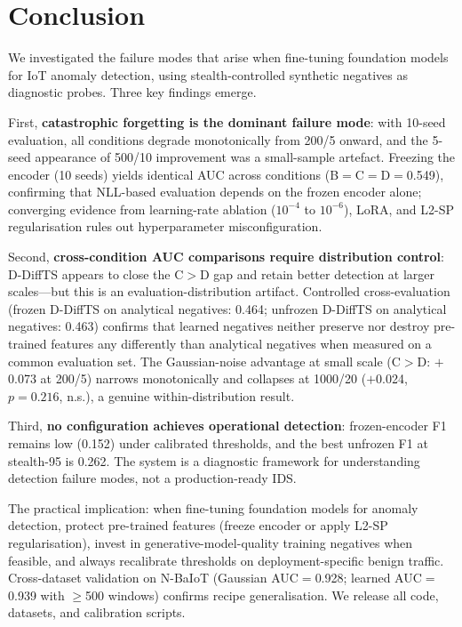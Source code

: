 \section{Conclusion}
\label{sec:conclusion}

We investigated the failure modes that arise when fine-tuning foundation
models for IoT anomaly detection, using stealth-controlled synthetic
negatives as diagnostic probes.  Three key findings emerge.

First, \textbf{catastrophic forgetting is the dominant failure mode}:
with 10-seed evaluation, all conditions degrade monotonically from 200/5
onward, and the 5-seed appearance of 500/10 improvement was a small-sample
artefact.
Freezing the encoder (10 seeds) yields identical AUC across conditions
(B$=$C$=$D$=$0.549), confirming that NLL-based evaluation depends on
the frozen encoder alone; converging evidence from learning-rate ablation
($10^{-4}$ to $10^{-6}$), LoRA, and L2-SP regularisation rules out
hyperparameter misconfiguration.

Second, \textbf{cross-condition AUC comparisons require distribution control}:
D-DiffTS appears to close the C$>$D gap and retain better detection at
larger scales---but this is an evaluation-distribution artifact.
Controlled cross-evaluation (frozen D-DiffTS on analytical negatives: 0.464;
unfrozen D-DiffTS on analytical negatives: 0.463) confirms that learned
negatives neither preserve nor destroy pre-trained features any differently
than analytical negatives when measured on a common evaluation set.
The Gaussian-noise advantage at small scale (C$>$D: $+$0.073 at 200/5)
narrows monotonically and collapses at 1000/20 ($+$0.024, $p{=}0.216$, n.s.),
a genuine within-distribution result.

Third, \textbf{no configuration achieves operational detection}:
frozen-encoder F1 remains low (0.152) under calibrated thresholds,
and the best unfrozen F1 at stealth-95 is 0.262.
The system is a diagnostic framework for understanding detection failure
modes, not a production-ready IDS.

The practical implication: when fine-tuning foundation models for
anomaly detection, protect pre-trained features (freeze encoder or
apply L2-SP regularisation), invest in generative-model-quality training
negatives when feasible, and always recalibrate thresholds on
deployment-specific benign traffic.
Cross-dataset validation on N-BaIoT (Gaussian AUC$=$0.928;
learned AUC$=$0.939 with $\geq$500 windows) confirms recipe
generalisation.
We release all code, datasets, and calibration scripts.
